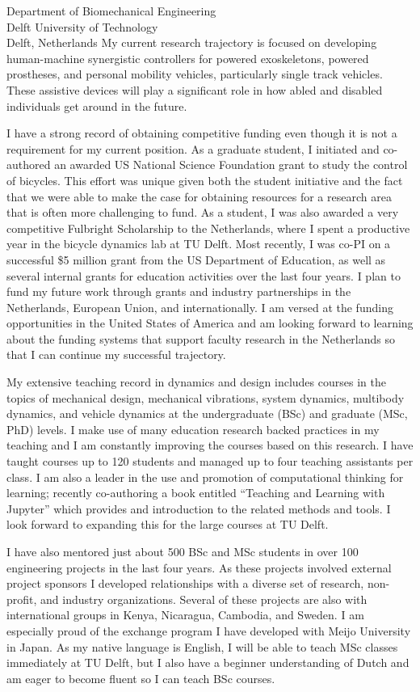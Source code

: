 \documentclass{letter}
\begin{document}
\begin{letter}{
  Department of Biomechanical Engineering \\
  Delft University of Technology \\
  Delft, Netherlands
}
My current research trajectory is focused on developing human-machine
synergistic controllers for powered exoskeletons, powered prostheses, and
personal mobility vehicles, particularly single track vehicles. These assistive
devices will play a significant role in how abled and disabled individuals get
around in the future.

I have a strong record of obtaining competitive funding even though it is not a
requirement for my current position. As a graduate student, I initiated and
co-authored an awarded US National Science Foundation grant to study the
control of bicycles. This effort was unique given both the student initiative
and the fact that we were able to make the case for obtaining resources for a
research area that is often more challenging to fund. As a student, I was also
awarded a very competitive Fulbright Scholarship to the Netherlands, where I
spent a productive year in the bicycle dynamics lab at TU Delft. Most recently,
I was co-PI on a successful \$5 million grant from the US Department of
Education, as well as several internal grants for education activities over the
last four years. I plan to fund my future work through grants and industry
partnerships in the Netherlands, European Union, and internationally. I am
versed at the funding opportunities in the United States of America and am
looking forward to learning about the funding systems that support faculty
research in the Netherlands so that I can continue my successful trajectory.

My extensive teaching record in dynamics and design includes courses in the
topics of mechanical design, mechanical vibrations, system dynamics, multibody
dynamics, and vehicle dynamics at the undergraduate (BSc) and graduate (MSc,
PhD) levels. I make use of many education research backed practices in my
teaching and I am constantly improving the courses based on this research. I
have taught courses up to 120 students and managed up to four teaching
assistants per class. I am also a leader in the use and promotion of
computational thinking for learning; recently co-authoring a book entitled
``Teaching and Learning with Jupyter'' which provides and introduction to the
related methods and tools. I look forward to expanding this for the large
courses at TU Delft.

I have also mentored just about 500 BSc and MSc students in over 100
engineering projects in the last four years. As these projects involved
external project sponsors I developed relationships with a diverse set of
research, non-profit, and industry organizations. Several of these projects are
also with international groups in Kenya, Nicaragua, Cambodia, and Sweden. I am
especially proud of the exchange program I have developed with Meijo University
in Japan. As my native language is English, I will be able to teach MSc classes
immediately at TU Delft, but I also have a beginner understanding of Dutch and
am eager to become fluent so I can teach BSc courses.


\end{letter}
\end{document}
